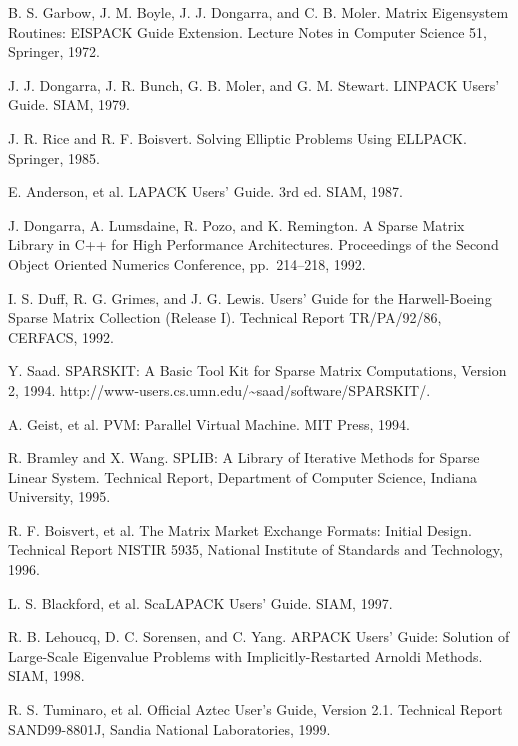 \documentclass[a4paper]{article}
\begin{document}
\begin{thebibliography}{10}
B. S. Garbow, J. M. Boyle, J. J. Dongarra, and C. B. Moler.
\newblock Matrix Eigensystem Routines: EISPACK Guide Extension.
\newblock Lecture Notes in Computer Science 51, Springer, 1972.

J. J. Dongarra, J. R. Bunch, G. B. Moler, and G. M. Stewart.
\newblock LINPACK Users' Guide.
\newblock SIAM, 1979.

J. R. Rice and R. F. Boisvert.
\newblock Solving Elliptic Problems Using ELLPACK.
\newblock Springer, 1985.

E. Anderson, et al. 
\newblock LAPACK Users' Guide. 3rd ed.
\newblock SIAM, 1987.

J. Dongarra, A. Lumsdaine, R. Pozo, and K. Remington.
\newblock A Sparse Matrix Library in C++ for High Performance Architectures.
\newblock Proceedings of the Second Object Oriented Numerics Conference,
	pp.\ 214--218, 1992.

I. S. Duff, R. G. Grimes, and J. G. Lewis.
\newblock Users' Guide for the Harwell-Boeing Sparse Matrix Collection
(Release I).
\newblock Technical Report TR/PA/92/86, CERFACS, 1992.

Y. Saad.
\newblock SPARSKIT: A Basic Tool Kit for Sparse Matrix Computations,
  Version 2, 1994.
\newblock http://www-users.cs.umn.edu/\textasciitilde saad/software/SPARSKIT/.

A. Geist, et al.
\newblock PVM: Parallel Virtual Machine.
\newblock MIT Press, 1994.

R. Bramley and X. Wang.
\newblock SPLIB: A Library of Iterative Methods for Sparse Linear System.
\newblock Technical Report, Department of Computer Science, Indiana University, 1995.

R. F. Boisvert, et al. 
\newblock The Matrix Market Exchange Formats: Initial Design. 
\newblock Technical Report NISTIR 5935, National Institute of Standards and
	Technology, 1996.

L. S. Blackford, et al.
\newblock ScaLAPACK Users' Guide.
\newblock SIAM, 1997.

R. B. Lehoucq, D. C. Sorensen, and C. Yang.
\newblock ARPACK Users' Guide: Solution of Large-Scale Eigenvalue Problems with Implicitly-Restarted Arnoldi Methods. 
\newblock SIAM, 1998. 

R. S. Tuminaro, et al.
\newblock Official Aztec User's Guide, Version 2.1.
\newblock Technical Report SAND99-8801J, Sandia National Laboratories, 1999.


\end{thebibliography}
\end{document}

